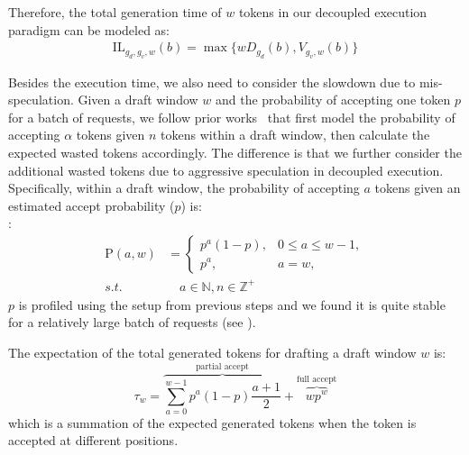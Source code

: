 Therefore, the total generation time of $w$ tokens in our decoupled execution paradigm
can be modeled as: \\[-10pt]
\begin{align*}
    \mathrm{IL}_{g_d,g_v,w}(b) = \max \{wD_{g_d}(b), V_{g_v,w}(b)\}    
\end{align*}


Besides the execution time, we also need to consider the 
slowdown due to mis-speculation. 
Given a draft window $w$ and the probability of accepting one token $p$ for a batch of
requests, we follow prior works~\cite{DBLP:journals/corr/abs-2505-19645,turbospec} that
first model the probability of accepting $\alpha$ tokens
given $n$ tokens within a draft window,
then calculate the expected wasted tokens accordingly.
The difference is that we further consider the additional wasted tokens due to
aggressive speculation in decoupled execution. 
Specifically, within a draft window, 
the probability of accepting $a$ tokens 
given an estimated accept probability ($p$) is: \\[-10pt]:
\begin{align*}
    \mathrm{P}(a, w) &=
\begin{cases}
p^a (1 - p), & 0 \leq a \leq w - 1,\\[0.5em]
p^a, & a = w,
\end{cases} \\
    s.t.  &\quad a \in \mathbb{N}, n \in \mathbb{Z^+}
\end{align*}
\noindent
$p$ is profiled using the setup from previous steps 
and we found it is quite stable
for a relatively large batch of requests 
(see ).

The expectation of the total generated tokens for drafting a draft window $w$ is: \\[-10pt]
\begin{equation*}
    \tau_w =
\overbrace{\sum_{a=0}^{w-1} p^{a}(1-p)
        \frac{a+1}{2}}^{\text{partial accept}}
+ \overbrace{w p^w}^{\text{full accept}}
\end{equation*}
\noindent 
which is a summation of the expected generated tokens when the token is accepted
at different positions.
    

